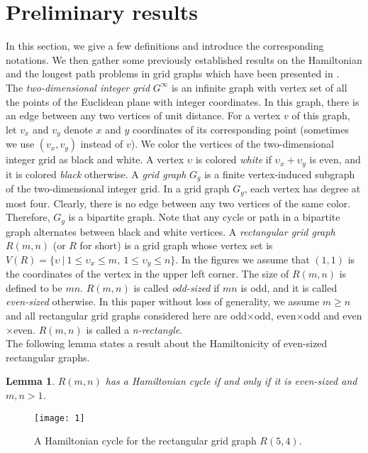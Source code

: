 \documentclass[preprint,12pt]{elsarticle}
\newtheorem{lem}{Lemma}[section]
\begin{document}
\section{Preliminary results}
In this section, we give a few definitions and introduce the
corresponding notations. We then gather some previously established
results on the Hamiltonian and the longest path problems
in grid graphs which have been presented in \cite{CST:AFAFCHPIM, IPS:HPIGG, FAA:ALAFFLPIRGG}.\\
The \textit{two-dimensional integer grid} $G^\infty$ is an infinite
graph with vertex set of all the points of the Euclidean plane with
integer coordinates. In this graph, there is an edge between any two
vertices of unit distance. For a vertex $v$ of this graph, let
$v_{x}$ and $v_{y}$ denote $x$ and $y$ coordinates of its
corresponding point (sometimes we use $(v_x,v_y)$ instead of $v$).
We color the vertices of the two-dimensional integer grid as black
and white. A vertex $\upsilon$ is colored \textit{white} if
$\upsilon_{x}+\upsilon_{y}$ is even, and it is colored
\textit{black} otherwise. A \textit{grid graph} $G_{g}$ is a finite
vertex-induced subgraph of the two-dimensional integer grid. In a
grid graph $G_{g}$, each vertex has degree at most four. Clearly,
there is no edge between any two vertices of the same color.
Therefore, $G_{g}$ is a bipartite graph. Note that any cycle or path
in a bipartite graph alternates between black and white vertices. A
\textit{rectangular grid graph} $R(m,n)$ (or $R$ for short) is a
grid graph whose vertex set is $V(R)= \{\upsilon \ |\ 1 \leq
\upsilon_{x}\leq m, \ 1\leq \upsilon_{y}\leq n\}$. In the figures we
assume that $(1,1)$ is the coordinates of the vertex in the upper
left corner. The size of $R(m,n)$ is defined to be $mn$. $R(m,n)$ is
called \textit{odd-sized} if $mn$ is odd, and it is called
\textit{even-sized} otherwise. In this paper without loss of
generality, we assume $m\geq n$ and all rectangular grid graphs
considered here are odd$\times$odd, even$\times$odd and
even$\times$even. $R(m,n)$ is called a \textit{n-rectangle}.\\
The following lemma states a result about the Hamiltonicity of
even-sized rectangular graphs.
\begin{lem}
\label{Lemma:1} \cite{CST:AFAFCHPIM} $R(m,n)$ has a Hamiltonian
cycle if and only if it is even-sized and $m,n>1$.
\end{lem}

\begin{figure}[tb]
  \centering
  \texttt{[image: 1]}
  \caption[]{\small A Hamiltonian cycle for the rectangular grid graph $R(5,4)$.}
\label{fig:hamcycle}
\end{figure}
\end{document}
